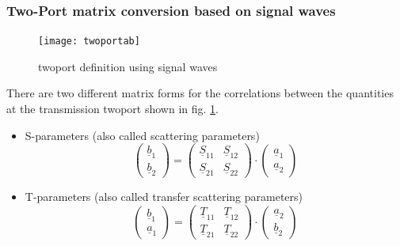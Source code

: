 \subsubsection{Two-Port matrix conversion based on signal waves}

\begin{figure}[ht]
\begin{center}
\texttt{[image: twoportab]}
\end{center}
\caption{twoport definition using signal waves}
\label{fig:twoportab}
\end{figure}
\FloatBarrier

There are two different matrix forms for the correlations between the
quantities at the transmission twoport shown in
fig. \ref{fig:twoportab}.

\begin{itemize}

\item S-parameters (also called scattering parameters)
\begin{equation}
\label{eq:sparamdef}
\begin{pmatrix}
\underline{b}_{1}\\
\underline{b}_{2}
\end{pmatrix}
=
\begin{pmatrix}
\underline{S}_{11} & \underline{S}_{12}\\
\underline{S}_{21} & \underline{S}_{22}
\end{pmatrix}
\cdot
\begin{pmatrix}
\underline{a}_{1}\\
\underline{a}_{2}
\end{pmatrix}
\end{equation}

\item T-parameters (also called transfer scattering parameters)
\begin{equation}
\label{eq:tparamdef}
\begin{pmatrix}
\underline{b}_{1}\\
\underline{a}_{1}
\end{pmatrix}
=
\begin{pmatrix}
\underline{T}_{11} & \underline{T}_{12}\\
\underline{T}_{21} & \underline{T}_{22}
\end{pmatrix}
\cdot
\begin{pmatrix}
\underline{a}_{2}\\
\underline{b}_{2}
\end{pmatrix}
\end{equation}

\end{itemize}


